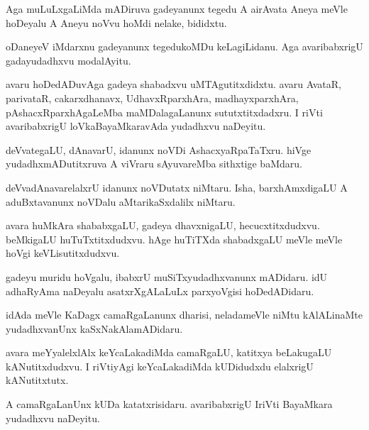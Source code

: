 \documentclass{article}
\begin{document}
\begin{mng}%
Aga muLuLxgaLiMda mADiruva gadeyanunx tegedu A airAvata Aneya meVle hoDeyalu A Aneyu noVvu hoMdi 
nelake, bididxtu.
\end{mng}

\begin{mng}%
oDaneyeV iMdarxnu gadeyanunx tegedukoMDu keLagiLidanu. Aga avaribabxrigU gadayudadhxvu modalAyitu.
\end{mng}

\begin{mng}%
avaru hoDedADuvAga gadeya shabadxvu uMTAgutitxdidxtu. avaru AvataR, parivataR, cakarxdhanavx, 
UdhavxRparxhAra, madhayxparxhAra, pAshacxRparxhAgaLeMba maMDalagaLanunx sututxtitxdadxru. I riVti 
avaribabxrigU loVkaBayaMkaravAda yudadhxvu naDeyitu.
\end{mng}

\begin{mng}%
deVvategaLU, dAnavarU, idanunx noVDi AshacxyaRpaTaTxru. hiVge yudadhxmADutitxruva A viVraru 
sAyuvareMba sithxtige baMdaru.
\end{mng}

\begin{mng}%
deVvadAnavarelalxrU idanunx noVDutatx niMtaru. Isha, barxhAmxdigaLU A aduBxtavanunx noVDalu 
aMtarikaSxdalilx niMtaru.
\end{mng}

\begin{mng}%
avara huMkAra shababxgaLU, gadeya dhavxnigaLU, hecucxtitxdudxvu. beMkigaLU huTuTxtitxdudxvu. hAge 
huTiTXda shabadxgaLU meVle meVle hoVgi keVLisutitxdudxvu.
\end{mng}

\begin{mng}%
gadeyu muridu hoVgalu, ibabxrU muSiTxyudadhxvanunx mADidaru. idU adhaRyAma naDeyalu asatxrXgALaLuLx 
parxyoVgisi hoDedADidaru.
\end{mng}

\begin{mng}%
idAda meVle KaDagx camaRgaLanunx dharisi, neladameVle niMtu kAlALinaMte yudadhxvanUnx 
kaSxNakAlamADidaru.
\end{mng}

\begin{mng}%
avara meYyalelxlAlx keYcaLakadiMda camaRgaLU, katitxya beLakugaLU kANutitxdudxvu. I riVtiyAgi 
keYcaLakadiMda kUDidudxdu elalxrigU kANutitxtutx.
\end{mng}

\begin{mng}%
A camaRgaLanUnx kUDa katatxrisidaru. avaribabxrigU IriVti BayaMkara yudadhxvu naDeyitu.
\end{mng}
\end{document}
